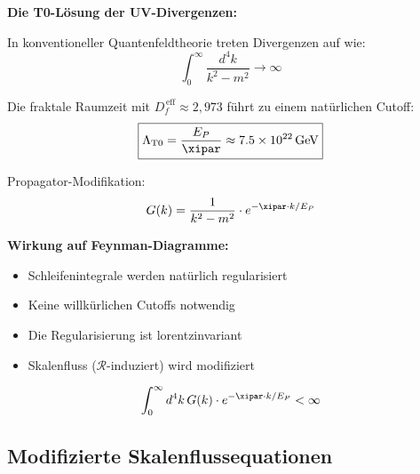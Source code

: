 	\begin{anwendung}
		\textbf{Die T0-Lösung der UV-Divergenzen:}
		
		In konventioneller Quantenfeldtheorie treten Divergenzen auf wie:
		\begin{equation}
			\int_0^\infty \frac{d^4k}{k^2 - m^2} \to \infty
		\end{equation}
		
		Die fraktale Raumzeit mit $D_f^{\,\text{eff}} \approx 2{,}973$ führt zu einem natürlichen Cutoff:
		\begin{equation}
			\boxed{\Lambda_{\text{T0}} = \frac{E_P}{\xipar} \approx 7.5 \times 10^{22}\, \text{GeV}}
		\end{equation}
		
		Propagator-Modifikation:
		\begin{equation}
			G(k) = \frac{1}{k^2 - m^2} \cdot e^{-\xipar \cdot k/E_P}
		\end{equation}
		
		\textbf{Wirkung auf Feynman-Diagramme:}
		\begin{itemize}
			\item Schleifenintegrale werden natürlich regularisiert
			\item Keine willkürlichen Cutoffs notwendig
			\item Die Regularisierung ist lorentzinvariant
			\item Skalenfluss ($\mathcal{R}$-induziert) wird modifiziert
		\end{itemize}
		
		\begin{equation}
			\int_0^\infty d^4k\, G(k) \cdot e^{-\xipar \cdot k/E_P} < \infty
		\end{equation}
	\end{anwendung}
	
	\subsection{Modifizierte Skalenflussequationen}
	
